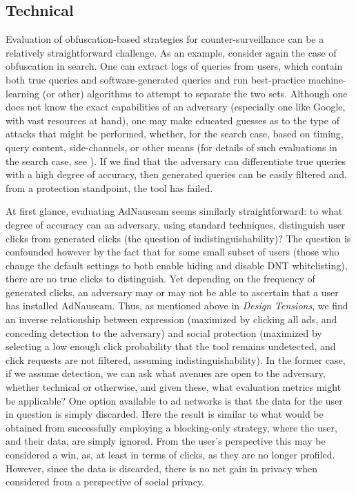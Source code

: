 \documentclass[conference]{IEEEtran}
\begin{document}
\subsection{Technical}

Evaluation of obfuscation-based strategies for counter-surveillance can be a relatively straightforward challenge. As an example, consider again the case of obfuscation in search. One can extract logs of queries from users, which contain both true queries and software-generated queries and run best-practice machine-learning (or other) algorithms to attempt to separate the two sets. Although one does not know the exact capabilities of an adversary (especially one like Google, with vast resources at hand), one may make educated guesses as to the type of attacks that might be performed, whether, for the search case, based on timing, query content, side-channels, or other means (for details of such evaluations in the search case, see \cite{Gervais}).  If we find that the adversary can differentiate true queries with a high degree of accuracy, then generated queries can be easily filtered and, from a protection standpoint, the tool has failed.

At first glance, evaluating AdNauseam seems similarly straightforward: to what degree of accuracy can an adversary, using standard techniques, distinguish user clicks from generated clicks (the question of indistinguishability)? The question is confounded however by the fact that for some small subset of users (those who change the default settings to both enable hiding and disable DNT whitelisting), there are no true clicks to distinguish. Yet depending on the frequency of generated clicks, an adversary may or may not be able to ascertain that a user has installed AdNauseam. Thus, as mentioned above in \emph{Design Tensions}, we find an inverse relationship between expression (maximized by clicking all ads, and conceding detection to the adversary) and social protection (maximized by selecting a low enough click probability that the tool remains undetected, and click requests are not filtered, assuming indistinguishability). In the former case, if we assume detection, we can ask what avenues are open to the adversary, whether technical or otherwise, and given these, what evaluation metrics might be applicable? One option available to ad networks is that the data for the user in question is simply discarded. Here the result is similar to what would be obtained from successfully employing a blocking-only strategy, where the user, and their data, are simply ignored. From the user's perspective this may be considered a win, as, at least in terms of clicks, as they are no longer profiled. However, since the data is discarded, there is no net gain in privacy when considered from a perspective of social privacy.
\end{document}

